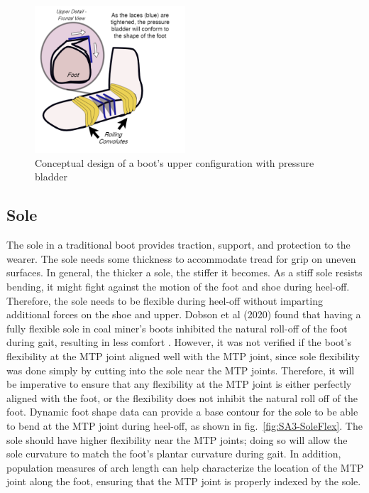 \documentclass[defaultstyle,11pt]{comps}
\begin{document}
\begin{figure}
\hypertarget{fig:SA3-Upper}{%
\centering
\includegraphics[width=0.5\textwidth,height=\textheight]{../fig/SA3/Upper.png}
\caption{Conceptual design of a boot's upper configuration with pressure bladder}\label{fig:SA3-Upper}
}
\end{figure}

\hypertarget{sole}{%
\subsection{Sole}\label{sole}}

The sole in a traditional boot provides traction, support, and protection to the wearer.
The sole needs some thickness to accommodate tread for grip on uneven surfaces.
In general, the thicker a sole, the stiffer it becomes.
As a stiff sole resists bending, it might fight against the motion of the foot and shoe during heel-off.
Therefore, the sole needs to be flexible during heel-off without imparting additional forces on the shoe and upper.
Dobson et al (2020) found that having a fully flexible sole in coal miner's boots inhibited the natural roll-off of the foot during gait, resulting in less comfort \citep{Dobson2020}.
However, it was not verified if the boot's flexibility at the MTP joint aligned well with the MTP joint, since sole flexibility was done simply by cutting into the sole near the MTP joints.
Therefore, it will be imperative to ensure that any flexibility at the MTP joint is either perfectly aligned with the foot, or the flexibility does not inhibit the natural roll off of the foot.
Dynamic foot shape data can provide a base contour for the sole to be able to bend at the MTP joint during heel-off, as shown in fig.~\ref{fig:SA3-SoleFlex}.
The sole should have higher flexibility near the MTP joints; doing so will allow the sole curvature to match the foot's plantar curvature during gait.
In addition, population measures of arch length can help characterize the location of the MTP joint along the foot, ensuring that the MTP joint is properly indexed by the sole.
\end{document}
